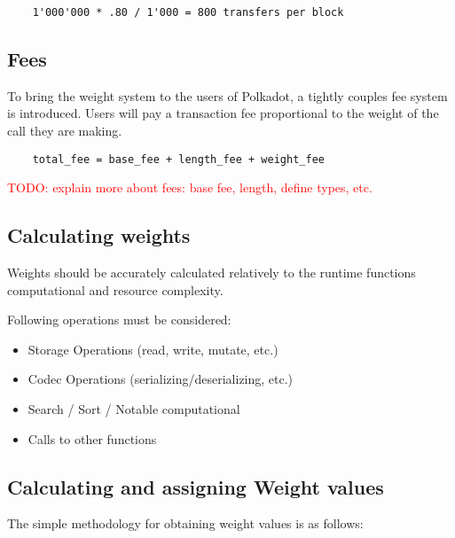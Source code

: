 \documentclass[11pt,a4paper]{article}
\newcommand{\todo}[1]{\textcolor{red}{TODO: #1}}
\begin{document}
\begin{verbatim}
    1'000'000 * .80 / 1'000 = 800 transfers per block
\end{verbatim}

\subsection{Fees}
To bring the weight system to the users of Polkadot, a tightly couples fee system
is introduced. Users will pay a transaction fee proportional to the weight of the
call they are making.

\begin{verbatim}
    total_fee = base_fee + length_fee + weight_fee
\end{verbatim}

\todo{explain more about fees: base fee, length, define types, etc.}

\subsection{Calculating weights}
Weights should be accurately calculated relatively to the runtime functions
computational and resource complexity.
\newline

Following operations must be considered:

\begin{itemize}
\item Storage Operations (read, write, mutate, etc.)
\item Codec Operations (serializing/deserializing, etc.)
\item Search / Sort / Notable computational
\item Calls to other functions
\end{itemize}

\subsection{Calculating and assigning Weight values}
The simple methodology for obtaining weight values is as follows:
\end{document}
